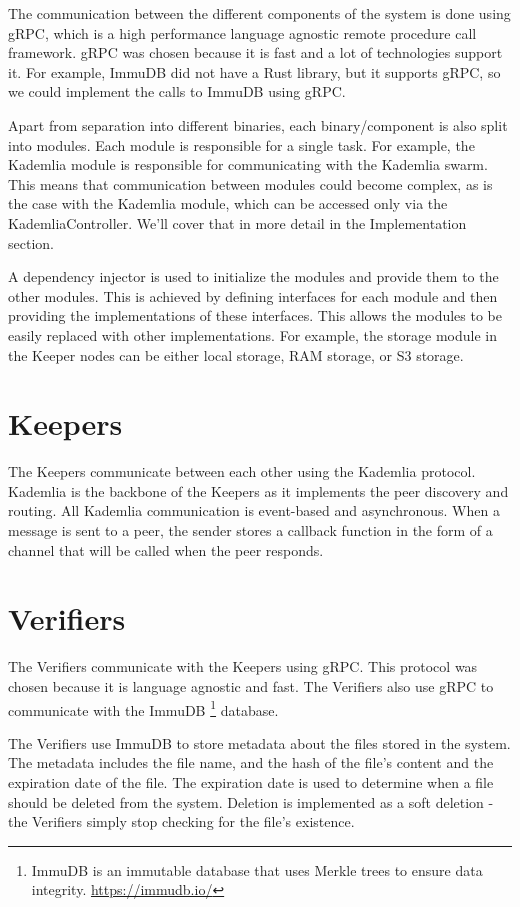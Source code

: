 \documentclass[ twoside,openright,titlepage,numbers=noenddot,headinclude,%
                footinclude=true,cleardoublepage=empty,abstractoff, %
                BCOR=5mm,paper=a4,fontsize=11pt,%
                ngerman,american,%
                ]{scrreprt}
\begin{document}
The communication between the different components of the system is done using gRPC,
which is a high performance language agnostic remote procedure call framework.
gRPC was chosen because it is fast and a lot of technologies support it.
For example, ImmuDB did not have a Rust library, but it supports gRPC,
so we could implement the calls to ImmuDB using gRPC.

Apart from separation into different binaries, each binary/component is also split into modules.
Each module is responsible for a single task.
For example, the Kademlia module is responsible for communicating with the Kademlia swarm.
This means that communication between modules could become complex, as is the case with the Kademlia module,
which can be accessed only via the KademliaController.
We'll cover that in more detail in the Implementation section.

A dependency injector is used to initialize the modules and provide them to the other modules.
This is achieved by defining interfaces for each module and then providing the implementations of these interfaces.
This allows the modules to be easily replaced with other implementations.
For example, the storage module in the Keeper nodes can be either local storage, RAM storage, or S3 storage.

\section{Keepers}

The Keepers communicate between each other using the Kademlia protocol.
Kademlia is the backbone of the Keepers as it implements the peer discovery and routing.
All Kademlia communication is event-based and asynchronous.
When a message is sent to a peer, the sender stores a callback
function in the form of a channel that will be called when the peer responds.

\section{Verifiers}

The Verifiers communicate with the Keepers using gRPC.
This protocol was chosen because it is language agnostic and fast.
The Verifiers also use gRPC to communicate with the ImmuDB
\footnote{ImmuDB is an immutable database that uses Merkle trees to ensure data integrity. \url{https://immudb.io/}}
database.

The Verifiers use ImmuDB to store metadata about the files stored in the system.
The metadata includes the file name, and the hash of the file's content and the expiration date of the file.
The expiration date is used to determine when a file should be deleted from the system.
Deletion is implemented as a soft deletion - the Verifiers simply stop checking for the file's existence.
\end{document}
